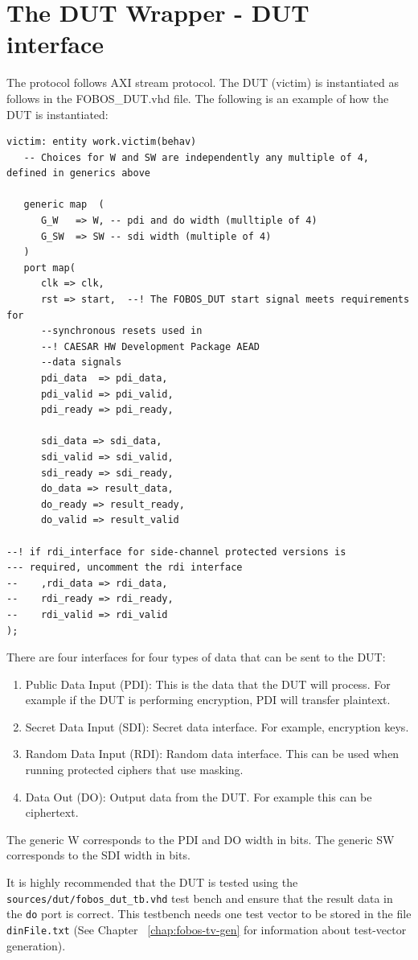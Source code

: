 \section{The DUT Wrapper - DUT interface}

The protocol follows AXI stream protocol.
The DUT (victim) is instantiated as follows in the FOBOS\_DUT.vhd file.
The following is an example of how the DUT is instantiated:

\begin{verbatim}
victim: entity work.victim(behav)
   -- Choices for W and SW are independently any multiple of 4, defined in generics above

   generic map  (
      G_W   => W, -- pdi and do width (mulltiple of 4)
      G_SW  => SW -- sdi width (multiple of 4) 
   )
   port map(
      clk => clk,
      rst => start,  --! The FOBOS_DUT start signal meets requirements for 
      --synchronous resets used in 
      --! CAESAR HW Development Package AEAD
      --data signals
      pdi_data  => pdi_data,
      pdi_valid => pdi_valid,
      pdi_ready => pdi_ready,

      sdi_data => sdi_data,
      sdi_valid => sdi_valid,
      sdi_ready => sdi_ready,
      do_data => result_data,
      do_ready => result_ready,
      do_valid => result_valid

--! if rdi_interface for side-channel protected versions is 
--- required, uncomment the rdi interface
--    ,rdi_data => rdi_data,
--    rdi_ready => rdi_ready,
--    rdi_valid => rdi_valid
);
\end{verbatim}

There are four interfaces for four types of data that can be sent to the DUT:
\begin{enumerate}
 \item Public Data Input (PDI): This is the data that the DUT will process. For example if the DUT is performing encryption, PDI will transfer plaintext.
 \item Secret Data Input (SDI): Secret data interface. For example, encryption keys.
 \item Random Data Input (RDI): Random data interface. This can be used when running protected ciphers that use masking.
 \item Data Out (DO): Output data from the DUT. For example this can be ciphertext.
\end{enumerate}


The generic W corresponds to the PDI and DO width in bits.
The generic SW corresponds to the SDI width in bits.


It is highly recommended that the DUT is tested using the \texttt{sources/dut/fobos\_dut\_tb.vhd} test bench and ensure that the result data in the \texttt{do} port is correct. 
This testbench needs one test vector to be stored in the file \texttt{dinFile.txt} (See Chapter~ \ref{chap:fobos-tv-gen} for information about test-vector generation).